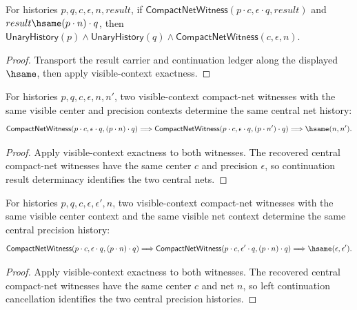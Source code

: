 \begin{theorem}\label{thm:compact-net-witness-visible-result-context-factorizes}
For histories $p,q,c,\epsilon,n,result$, if
$\mathsf{CompactNetWitness}(p\cdot c,\epsilon\cdot q,result)$ and
$result\hsame(p\cdot n)\cdot q$, then
$\mathsf{UnaryHistory}(p)\wedge\mathsf{UnaryHistory}(q)\wedge\mathsf{CompactNetWitness}(c,\epsilon,n)$.
\end{theorem}
\begin{proof}
Transport the result carrier and continuation ledger along the displayed $\hsame$, then apply visible-context exactness.
\end{proof}
\begin{theorem}
\label{thm:compact-net-witness-visible-context-result-deterministic}
For histories $p,q,c,\epsilon,n,n'$, two visible-context compact-net witnesses
with the same visible center and precision contexts determine the same central
net history:
$$
\mathsf{CompactNetWitness}(p\cdot c,\epsilon\cdot q,(p\cdot n)\cdot q)
\Longrightarrow
\mathsf{CompactNetWitness}(p\cdot c,\epsilon\cdot q,(p\cdot n')\cdot q)
\Longrightarrow
\hsame(n,n').
$$
\end{theorem}
\begin{proof}
Apply visible-context exactness to both witnesses. The recovered central
compact-net witnesses have the same center $c$ and precision $\epsilon$, so
continuation result determinacy identifies the two central nets.
\end{proof}

\begin{theorem}
\label{thm:compact-net-witness-visible-context-precision-deterministic}
For histories $p,q,c,\epsilon,\epsilon',n$, two visible-context compact-net
witnesses with the same visible center context and the same visible net context
determine the same central precision history:
$$
\mathsf{CompactNetWitness}(p\cdot c,\epsilon\cdot q,(p\cdot n)\cdot q)
\Longrightarrow
\mathsf{CompactNetWitness}(p\cdot c,\epsilon'\cdot q,(p\cdot n)\cdot q)
\Longrightarrow
\hsame(\epsilon,\epsilon').
$$
\end{theorem}
\begin{proof}
Apply visible-context exactness to both witnesses. The recovered central
compact-net witnesses have the same center $c$ and net $n$, so left
continuation cancellation identifies the two central precision histories.
\end{proof}

